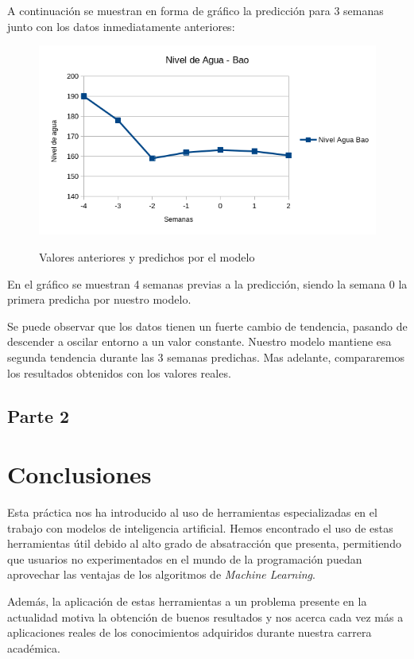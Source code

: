 \documentclass[12pt]{report} %
\begin{document}
A continuación se muestran en forma de gráfico la predicción para 3 semanas junto con los datos inmediatamente anteriores:

\begin{figure}[H]
    \includegraphics[width=\linewidth]{predict-1-bao.png}\\
    \caption{\small Valores anteriores y  predichos por el modelo}
\end{figure}
En el gráfico se muestran 4 semanas previas a la predicción, siendo la semana 0 la primera predicha por nuestro modelo.

Se puede observar que los datos tienen un fuerte cambio de tendencia, pasando de descender a oscilar entorno a un valor constante. Nuestro modelo mantiene esa segunda tendencia durante las 3 semanas predichas. Mas adelante, compararemos los resultados obtenidos con los valores reales.

\section{Parte 2}

\chapter{Conclusiones}
\label{chap:conclusion}

Esta práctica nos ha introducido al uso de herramientas especializadas en el trabajo con modelos de inteligencia artificial. Hemos encontrado el uso de estas herramientas útil debido al alto grado de absatracción que presenta, permitiendo que usuarios no experimentados en el mundo de la programación puedan aprovechar las ventajas de los algoritmos de \textit{Machine Learning}.

Además, la aplicación de estas herramientas a un problema presente en la actualidad motiva la obtención de buenos resultados y nos acerca cada vez más a aplicaciones reales de los conocimientos adquiridos durante nuestra carrera académica.
\end{document}
